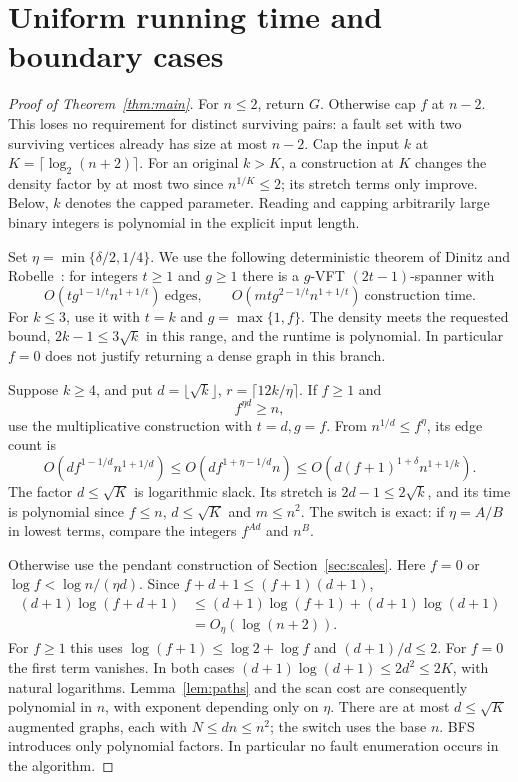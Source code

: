 \documentclass[acmsmall,11pt,screen,nonacm]{acmart}
\begin{document}
\section{Uniform running time and boundary cases}\label{sec:switch}

\begin{proof}[Proof of Theorem~\ref{thm:main}]
For $n\le2$, return $G$. Otherwise cap $f$ at $n-2$. This loses no
requirement for distinct surviving pairs: a fault set with two surviving
vertices already has size at most $n-2$. Cap the input $k$ at
$K=\lceil\log_2(n+2)\rceil$. For an original $k>K$, a construction at
$K$ changes the density factor by at most two since $n^{1/K}\le2$;
its stretch terms only improve. Below, $k$ denotes the capped parameter.
Reading and capping arbitrarily large binary integers is polynomial in
the explicit input length.

Set $\eta=\min\{\delta/2,1/4\}$. We use the following deterministic
theorem of Dinitz and Robelle~\cite[Theorems 2 and 9]{DR20}: for
integers $t\ge1$ and $g\ge1$ there is a $g$-VFT $(2t-1)$-spanner with
\[
 O(tg^{1-1/t}n^{1+1/t})\ \text{edges},\qquad
 O(mt g^{2-1/t}n^{1+1/t})\ \text{construction time}.
\]
For $k\le3$, use it with $t=k$ and $g=\max\{1,f\}$.
The density meets the requested bound, $2k-1\le3\sqrt{k}$ in this
range, and the runtime is polynomial. In particular $f=0$ does not
justify returning a dense graph in this branch.

Suppose $k\ge4$, and put $d=\lfloor\sqrt{k}\rfloor$,
$r=\lceil12k/\eta\rceil$. If $f\ge1$ and
\begin{equation}\label{eq:switch}
 f^{\eta d}\ge n,
\end{equation}
use the multiplicative construction with $t=d,g=f$. From
$n^{1/d}\le f^\eta$, its edge count is
\[
 O(df^{1-1/d}n^{1+1/d})
 \le O(df^{1+\eta-1/d}n)
 \le O(d(f+1)^{1+\delta}n^{1+1/k}).
\]
The factor $d\le\sqrt K$ is logarithmic slack. Its stretch is
$2d-1\le2\sqrt{k}$, and its time is polynomial since $f\le n$,
$d\le\sqrt K$ and $m\le n^2$. The switch is exact: if
$\eta=A/B$ in lowest terms, compare the integers $f^{Ad}$ and $n^B$.

Otherwise use the pendant construction of Section~\ref{sec:scales}.
Here $f=0$ or $\log f<\log n/(\eta d)$. Since
$f+d+1\le(f+1)(d+1)$,
\begin{align*}
 (d+1)\log(f+d+1)
 &\le(d+1)\log(f+1)+(d+1)\log(d+1)\\
 &=O_\eta(\log(n+2)).
\end{align*}
For $f\ge1$ this uses $\log(f+1)\le\log2+\log f$ and
$(d+1)/d\le2$. For $f=0$ the first term vanishes. In both cases
$(d+1)\log(d+1)\le2d^2\le2K$, with natural logarithms.
Lemma~\ref{lem:paths} and the scan cost are consequently polynomial in
$n$, with exponent depending only on $\eta$. There are at most
$d\le\sqrt K$ augmented graphs, each with $N\le dn\le n^2$;
the switch uses the base $n$. BFS introduces only polynomial factors.
In particular no fault enumeration occurs in the algorithm.


\end{proof}
\end{document}
